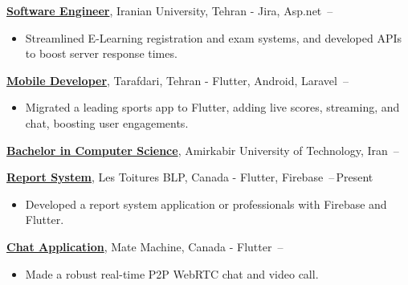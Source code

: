 \documentclass[letterpaper,11pt]{article}
\begin{document}
\Gap
\href{https://en.iranian.ac.ir}
{\textbf{Software Engineer}}, Iranian University, Tehran - Jira, Asp.net
\hfill {}\,--\,
\begin{itemize}[leftmargin=*, noitemsep, topsep=0pt, partopsep=0pt]
    \item Streamlined E-Learning registration and exam systems, and developed APIs to boost server response times.
\end{itemize}

\Gap
\href{https://tarafdari.com}
{\textbf{Mobile Developer}}, Tarafdari, Tehran - Flutter, Android, Laravel
\hfill {}\,--\,
\begin{itemize}[leftmargin=*, noitemsep, topsep=0pt, partopsep=0pt]
    \item Migrated a leading sports app to Flutter, adding live scores, streaming, and chat, boosting user engagements.
\end{itemize}



\href{https://aut.ac.ir/en}
{\textbf{Bachelor in Computer Science}}, Amirkabir University of Technology, Iran
\hfill {}\,--\,



\href{https://blpsst.com}
{\textbf{Report System}}, Les Toitures BLP, Canada - Flutter, Firebase
\hfill {}\,--\,Present
\begin{itemize}[leftmargin=*, noitemsep, topsep=0pt, partopsep=0pt]
    \item Developed a report system application or professionals with Firebase and Flutter.
\end{itemize}

\Gap
\href{https://github.com/aliyazdi75/flutter_chat}
{\textbf{Chat Application}}, Mate Machine, Canada - Flutter
\hfill {}\,--\,
\begin{itemize}[leftmargin=*, noitemsep, topsep=0pt, partopsep=0pt]
    \item Made a robust real-time P2P WebRTC chat and video call.
\end{itemize}
\end{document}
